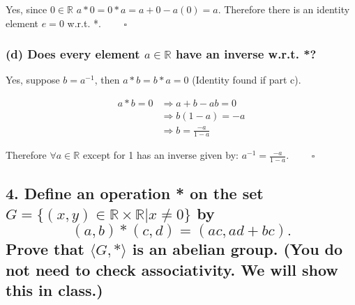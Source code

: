 \documentclass[
]{article}
\begin{document}
Yes, since \(0\in\mathbb{R}\) \(a*0=0*a=a+0-a(0)=a\). Therefore there is
an identity element \(e=0\) w.r.t. *. \(\quad\quad\square\)

\hypertarget{d-does-every-element-ainmathbbr-have-an-inverse-w.r.t.-1}{%
\subsubsection{\texorpdfstring{(d) Does every element \(a\in\mathbb{R}\)
have an inverse w.r.t.
*?}{(d) Does every element a\textbackslash in\textbackslash mathbb\{R\} have an inverse w.r.t. *?}}\label{d-does-every-element-ainmathbbr-have-an-inverse-w.r.t.-1}}

Yes, suppose \(b=a^{-1}\), then \(a*b=b*a=0\) (Identity found if part
c).

\begin{equation}
\label{3d}
\begin{split}
a*b=0 &\Rightarrow a+b-ab=0\\
&\Rightarrow b(1-a)=-a\\
&\Rightarrow b=\frac{-a}{1-a}
\end{split}
\end{equation}

Therefore \(\forall a\in\mathbb{R}\) except for 1 has an inverse given
by: \(a^{-1}=\frac{-a}{1-a}\). \(\quad\quad\square\)

\hypertarget{define-an-operation-on-the-set-gxyinmathbbrtimesmathbbrxne-0-by-abcdacadbc.-prove-that-langle-grangle-is-an-abelian-group.-you-do-not-need-to-check-associativity.-we-will-show-this-in-class.}{%
\subsection{\texorpdfstring{4. Define an operation * on the set
\(G=\{(x,y)\in\mathbb{R}\times\mathbb{R}|x\ne 0\}\) by
\[(a,b)*(c,d)=(ac,ad+bc).\] Prove that \(\langle G,*\rangle\) is an
abelian group. (You do not need to check associativity. We will show
this in
class.)}{4. Define an operation * on the set G=\textbackslash\{(x,y)\textbackslash in\textbackslash mathbb\{R\}\textbackslash times\textbackslash mathbb\{R\}\textbar x\textbackslash ne 0\textbackslash\} by (a,b)*(c,d)=(ac,ad+bc). Prove that \textbackslash langle G,*\textbackslash rangle is an abelian group. (You do not need to check associativity. We will show this in class.)}}\label{define-an-operation-on-the-set-gxyinmathbbrtimesmathbbrxne-0-by-abcdacadbc.-prove-that-langle-grangle-is-an-abelian-group.-you-do-not-need-to-check-associativity.-we-will-show-this-in-class.}}
\end{document}

